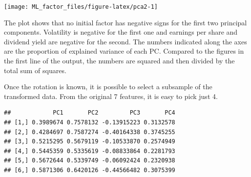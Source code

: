 \documentclass[]{krantz}
\makeatletter
\newenvironment{Shaded}{\begin{snugshade}}{\end{snugshade}}
\newcommand{\CommentTok}[1]{\textcolor[rgb]{0.37,0.37,0.37}{\textit{#1}}}
\newcommand{\DataTypeTok}[1]{\textcolor[rgb]{0.27,0.27,0.27}{#1}}
\newcommand{\DecValTok}[1]{\textcolor[rgb]{0.06,0.06,0.06}{#1}}
\newcommand{\KeywordTok}[1]{\textcolor[rgb]{0.27,0.27,0.27}{\textbf{#1}}}
\newcommand{\NormalTok}[1]{#1}
\newcommand{\OperatorTok}[1]{\textcolor[rgb]{0.43,0.43,0.43}{\textbf{#1}}}
\newcommand{\StringTok}[1]{\textcolor[rgb]{0.5,0.5,0.5}{#1}}
\newenvironment{kframe}{%
\medskip{}
\setlength{\fboxsep}{.8em}
 \def\at@end@of@kframe{}%
 \ifinner\ifhmode%
  \def\at@end@of@kframe{\end{minipage}}%
  \begin{minipage}{\columnwidth}%
 \fi\fi%
 \def\FrameCommand##1{\hskip\@totalleftmargin \hskip-\fboxsep
 \colorbox{shadecolor}{##1}\hskip-\fboxsep
     \hskip-\linewidth \hskip-\@totalleftmargin \hskip\columnwidth}%
 \MakeFramed {\advance\hsize-\width
   \@totalleftmargin\z@ \linewidth\hsize
   \@setminipage}}%
 {\par\unskip\endMakeFramed%
 \at@end@of@kframe}
\renewenvironment{Shaded}{\begin{kframe}}{\end{kframe}}
\theoremstyle{definition}
\theoremstyle{definition}
\theoremstyle{definition}
\theoremstyle{remark}
\makeatother
\begin{document}
\begin{center}\texttt{[image: ML\_factor\_files/figure-latex/pca2-1]} \end{center}

\normalsize

The plot shows that no initial factor has negative signs for the first
two principal components. Volatility is negative for the first one and
earnings per share and dividend yield are negative for the second. The
numbers indicated along the axes are the proportion of explained
variance of each PC. Compared to the figures in the first line of the
output, the numbers are squared and then divided by the total sum of
squares.

Once the rotation is known, it is possible to select a subsample of the
transformed data. From the original 7 features, it is easy to pick just
4.

\footnotesize

\begin{Shaded}
\end{Shaded}

\begin{verbatim}
##            PC1       PC2         PC3       PC4
## [1,] 0.3989674 0.7578132 -0.13915223 0.3132578
## [2,] 0.4284697 0.7587274 -0.40164338 0.3745255
## [3,] 0.5215295 0.5679119 -0.10533870 0.2574949
## [4,] 0.5445359 0.5335619 -0.08833864 0.2281793
## [5,] 0.5672644 0.5339749 -0.06092424 0.2320938
## [6,] 0.5871306 0.6420126 -0.44566482 0.3075399
\end{verbatim}
\end{document}
